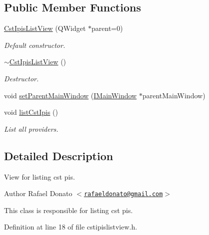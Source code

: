 \subsection*{\-Public \-Member \-Functions}
\begin{DoxyCompactItemize}
\item 
\hyperlink{class_cst_ipis_list_view_a8bda289539c828b75b331deb215bcad3}{\-Cst\-Ipis\-List\-View} (\-Q\-Widget $\ast$parent=0)
\begin{DoxyCompactList}\small\item\em \-Default constructor. \end{DoxyCompactList}\item 
\hyperlink{class_cst_ipis_list_view_a3b4d29f8727efc7abce6758de63f2d2d}{$\sim$\-Cst\-Ipis\-List\-View} ()
\begin{DoxyCompactList}\small\item\em \-Destructor. \end{DoxyCompactList}\item 
void \hyperlink{class_cst_ipis_list_view_aa74fca17adda5fe42cf3dd9116dfee9a}{set\-Parent\-Main\-Window} (\hyperlink{class_i_main_window}{\-I\-Main\-Window} $\ast$parent\-Main\-Window)
\item 
void \hyperlink{class_cst_ipis_list_view_ae594e32437ebada481ad8385af962af8}{list\-Cst\-Ipis} ()
\begin{DoxyCompactList}\small\item\em \-List all providers. \end{DoxyCompactList}\end{DoxyCompactItemize}


\subsection{\-Detailed \-Description}
\-View for listing cst pis. 

\begin{DoxyAuthor}{\-Author}
\-Rafael \-Donato $<$\href{mailto:rafaeldonato@gmail.com}{\tt rafaeldonato@gmail.\-com}$>$
\end{DoxyAuthor}
\-This class is responsible for listing cst pis. 

\-Definition at line 18 of file cstipislistview.\-h.



